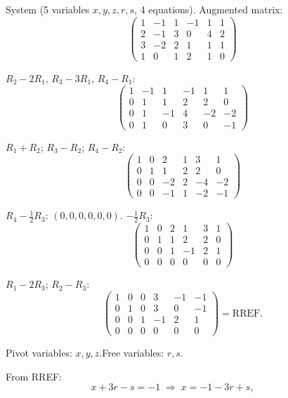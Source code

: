 \documentclass[12pt,a3paper]{article}
\begin{document}
\begin{tcolorbox}[enhanced,breakable,
  colback=cB!4,colframe=cB,boxrule=0.8pt,arc=5pt,
  title={\textbf{Answer --- Gaussian Elimination: $x-y+z-r+s=1$, etc.}},
  fonttitle=\bfseries\color{white},colbacktitle=cB]

System (5 variables $x,y,z,r,s$, 4 equations). Augmented matrix:
\[
\left(\begin{array}{ccccc|c}1&-1&1&-1&1&1\\2&-1&3&0&4&2\\3&-2&2&1&1&1\\1&0&1&2&1&0\end{array}\right)
\]

$R_2-2R_1$, $R_3-3R_1$, $R_4-R_1$:
\[
\left(\begin{array}{ccccc|c}1&-1&1&-1&1&1\\0&1&1&2&2&0\\0&1&-1&4&-2&-2\\0&1&0&3&0&-1\end{array}\right)
\]

$R_1+R_2$; $R_3-R_2$; $R_4-R_2$:
\[
\left(\begin{array}{ccccc|c}1&0&2&1&3&1\\0&1&1&2&2&0\\0&0&-2&2&-4&-2\\0&0&-1&1&-2&-1\end{array}\right)
\]

$R_4-\frac{1}{2}R_3$: $(0,0,0,0,0,0)$. \quad $-\frac{1}{2}R_3$:
\[
\left(\begin{array}{ccccc|c}1&0&2&1&3&1\\0&1&1&2&2&0\\0&0&1&-1&2&1\\0&0&0&0&0&0\end{array}\right)
\]

$R_1-2R_3$; $R_2-R_3$:
\[
\left(\begin{array}{ccccc|c}1&0&0&3&-1&-1\\0&1&0&3&0&-1\\0&0&1&-1&2&1\\0&0&0&0&0&0\end{array}\right)
= \mathrm{RREF}.
\]

Pivot variables: $x,y,z$.\quad Free variables: $r,s$.

From RREF:
\[
x + 3r - s = -1 \;\Rightarrow\; x=-1-3r+s,\qquad
\]


\end{tcolorbox}
\end{document}
